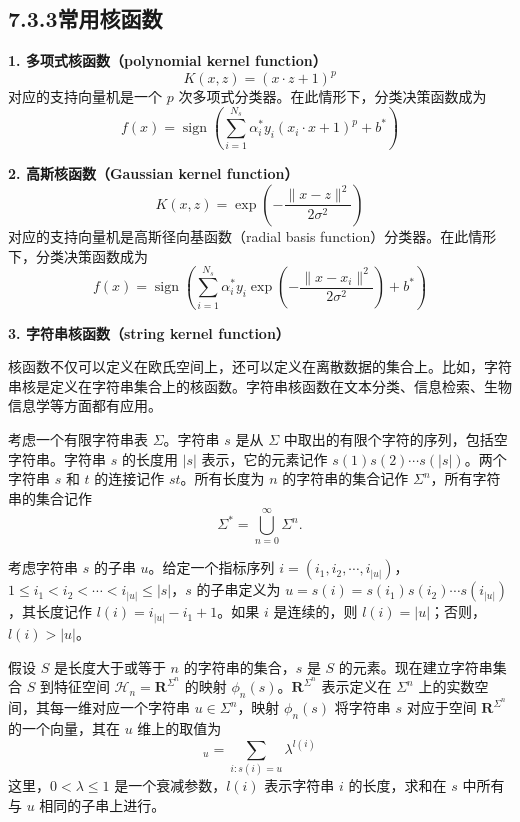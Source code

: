 \documentclass[UTF8, 12pt, fontset=fandol, oneside]{ctexart}
\begin{document}
\subsection*{7.3.3\quad 常用核函数}

\noindent\textbf{1. 多项式核函数（polynomial kernel function）}
\begin{equation}
K(x,z)=(x\cdot z+1)^p
\tag{7.88}
\end{equation}
对应的支持向量机是一个 $p$ 次多项式分类器。在此情形下，分类决策函数成为
\begin{equation}
f(x)=\operatorname{sign}\left(\sum_{i=1}^{N_s}\alpha_i^*y_i(x_i\cdot x+1)^p+b^*\right)
\tag{7.89}
\end{equation}

\noindent\textbf{2. 高斯核函数（Gaussian kernel function）}
\begin{equation}
K(x,z)=\exp\left(-\frac{\|x-z\|^2}{2\sigma^2}\right)
\tag{7.90}
\end{equation}
对应的支持向量机是高斯径向基函数（radial basis function）分类器。在此情形下，分类决策函数成为
\begin{equation}
f(x)=\operatorname{sign}\left(\sum_{i=1}^{N_s}\alpha_i^*y_i\exp\left(-\frac{\|x-x_i\|^2}{2\sigma^2}\right)+b^*\right)
\tag{7.91}
\end{equation}

\noindent\textbf{3. 字符串核函数（string kernel function）}

核函数不仅可以定义在欧氏空间上，还可以定义在离散数据的集合上。比如，字符串核是定义在字符串集合上的核函数。字符串核函数在文本分类、信息检索、生物信息学等方面都有应用。

考虑一个有限字符串表 $\Sigma$。字符串 $s$ 是从 $\Sigma$ 中取出的有限个字符的序列，包括空字符串。字符串 $s$ 的长度用 $|s|$ 表示，它的元素记作 $s(1)s(2)\cdots s(|s|)$。两个字符串 $s$ 和 $t$ 的连接记作 $st$。所有长度为 $n$ 的字符串的集合记作 $\Sigma^n$，所有字符串的集合记作
\[
\Sigma^*=\bigcup_{n=0}^{\infty}\Sigma^n.
\]

考虑字符串 $s$ 的子串 $u$。给定一个指标序列 $i=(i_1,i_2,\cdots,i_{|u|})$，$1\leq i_1<i_2<\cdots<i_{|u|}\leq |s|$，$s$ 的子串定义为 $u=s(i)=s(i_1)s(i_2)\cdots s(i_{|u|})$，其长度记作 $l(i)=i_{|u|}-i_1+1$。如果 $i$ 是连续的，则 $l(i)=|u|$；否则，$l(i)>|u|$。

假设 $S$ 是长度大于或等于 $n$ 的字符串的集合，$s$ 是 $S$ 的元素。现在建立字符串集合 $S$ 到特征空间 $\mathcal{H}_n=\mathbf{R}^{\Sigma^n}$ 的映射 $\phi_n(s)$。$\mathbf{R}^{\Sigma^n}$ 表示定义在 $\Sigma^n$ 上的实数空间，其每一维对应一个字符串 $u\in\Sigma^n$，映射 $\phi_n(s)$ 将字符串 $s$ 对应于空间 $\mathbf{R}^{\Sigma^n}$ 的一个向量，其在 $u$ 维上的取值为
\begin{equation}
[\phi_n(s)]_u=\sum_{i:s(i)=u}\lambda^{l(i)}
\tag{7.92}
\end{equation}
这里，$0<\lambda\leq 1$ 是一个衰减参数，$l(i)$ 表示字符串 $i$ 的长度，求和在 $s$ 中所有与 $u$ 相同的子串上进行。
\end{document}

